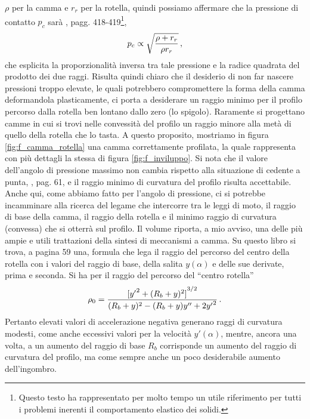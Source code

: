 $\rho$ per la camma e $r_r$ per la rotella, quindi possiamo affermare che la pressione di contatto
$p_c$ sar\`a \cite{timoshenko}, pagg. 418-419\footnote{Questo testo ha rappresentato per  
molto tempo un utile riferimento per tutti i problemi inerenti
il comportamento elastico dei solidi.},
\begin{equation}
p_c \propto \sqrt {{\rho + r_r}\over {\rho r_r}}\,,
\label{eq_hertz}
\end{equation}
\noindent che esplicita la proporzionalit\`a inversa tra tale pressione e la radice
quadrata del prodotto dei due raggi. Risulta quindi chiaro che il desiderio
di non far nascere pressioni troppo elevate, le quali potrebbero compromettere
la forma della
camma deformandola plasticamente, ci porta a desiderare un raggio minimo per il
profilo percorso dalla rotella ben lontano dallo zero
(lo spigolo). Raramente si progettano camme in cui si trovi nelle convessit\`a
del profilo un raggio minore alla met\`a di quello della rotella che lo tasta.
A questo proposito, mostriamo in figura \ref{fig:f_camma_rotella} una camma
correttamente profilata, la quale rappresenta con pi\`u
dettagli la stessa di figura \ref{fig:f_inviluppo}. Si nota che il valore dell'angolo
di pressione massimo non cambia rispetto alla situazione di cedente a punta,
\cite{molian}, pag. 61,
e il raggio minimo di curvatura del profilo risulta
accettabile.
Anche qui, come abbiamo fatto per l'angolo di pressione, ci si potrebbe incamminare alla ricerca
del legame che intercorre tra le leggi di moto, il raggio di base della camma, il raggio della rotella e  
il minimo raggio di curvatura (convessa) che si otterr\`a sul profilo.
Il volume \cite{ruggieri} riporta, a mio avviso, una delle pi\`u ampie e utili
trattazioni della sintesi di meccanismi a camma. Su questo libro si trova,
a pagina 59 una, formula che lega il raggio del percorso del centro della rotella
con i valori del raggio di base, della salita $y(\alpha)$ e delle sue derivate, prima e seconda.
Si ha per il raggio del percorso del  ``centro rotella''
\begin{equation}
\rho_0={{[{y'}^2+(R_b + y)^2]}^{3/2}\over{(R_b + y)^2-(R_b +y)y'' +2{y'}^2}}\,.
\label{r_cur}
\end{equation}
\noindent Pertanto elevati valori di accelerazione negativa generano raggi di curvatura modesti, come anche 
eccessivi valori per la velocit\`a $y'(\alpha)$, mentre, ancora una volta, a
un aumento del raggio di base $R_b$ corrisponde un aumento del raggio di curvatura
del profilo, ma come sempre anche un poco desiderabile aumento dell'ingombro. 
